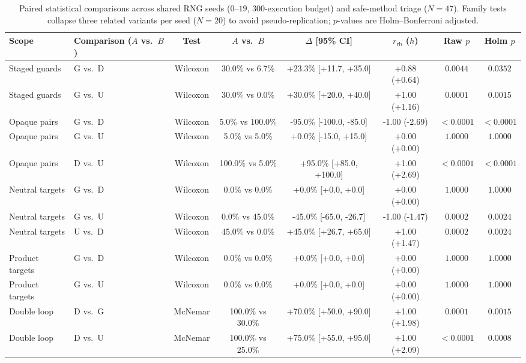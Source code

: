 \begin{table}[t]
\centering
\caption{Paired statistical comparisons across shared RNG seeds ($0$--$19$, 300-execution budget) and safe-method triage ($N = 47$). Family tests collapse three related variants per seed ($N=20$) to avoid pseudo-replication; $p$-values are Holm--Bonferroni adjusted.}
\label{tab:rq2-rq3-stats}
\small
\begin{tabular}{llcccccc}
\toprule
Scope & Comparison ($A$ vs.\ $B$) & Test & $A$ vs.\ $B$ & $\Delta$ [95\% CI] & $r_{\text{rb}}$ ($h$) & Raw $p$ & Holm $p$ \\
\midrule
Staged guards & G vs.\ D & Wilcoxon & 30.0\% vs 6.7\% & +23.3\% [+11.7, +35.0] & +0.88 (+0.64) & $0.0044$ & $0.0352$ \\
Staged guards & G vs.\ U & Wilcoxon & 30.0\% vs 0.0\% & +30.0\% [+20.0, +40.0] & +1.00 (+1.16) & $0.0001$ & $0.0015$ \\
Opaque pairs & G vs.\ D & Wilcoxon & 5.0\% vs 100.0\% & -95.0\% [-100.0, -85.0] & -1.00 (-2.69) & $<0.0001$ & $<0.0001$ \\
Opaque pairs & G vs.\ U & Wilcoxon & 5.0\% vs 5.0\% & +0.0\% [-15.0, +15.0] & +0.00 (+0.00) & $1.0000$ & $1.0000$ \\
Opaque pairs & D vs.\ U & Wilcoxon & 100.0\% vs 5.0\% & +95.0\% [+85.0, +100.0] & +1.00 (+2.69) & $<0.0001$ & $<0.0001$ \\
Neutral targets & G vs.\ D & Wilcoxon & 0.0\% vs 0.0\% & +0.0\% [+0.0, +0.0] & +0.00 (+0.00) & $1.0000$ & $1.0000$ \\
Neutral targets & G vs.\ U & Wilcoxon & 0.0\% vs 45.0\% & -45.0\% [-65.0, -26.7] & -1.00 (-1.47) & $0.0002$ & $0.0024$ \\
Neutral targets & U vs.\ D & Wilcoxon & 45.0\% vs 0.0\% & +45.0\% [+26.7, +65.0] & +1.00 (+1.47) & $0.0002$ & $0.0024$ \\
Product targets & G vs.\ D & Wilcoxon & 0.0\% vs 0.0\% & +0.0\% [+0.0, +0.0] & +0.00 (+0.00) & $1.0000$ & $1.0000$ \\
Product targets & G vs.\ U & Wilcoxon & 0.0\% vs 0.0\% & +0.0\% [+0.0, +0.0] & +0.00 (+0.00) & $1.0000$ & $1.0000$ \\
Double loop & D vs.\ G & McNemar & 100.0\% vs 30.0\% & +70.0\% [+50.0, +90.0] & +1.00 (+1.98) & $0.0001$ & $0.0015$ \\
Double loop & D vs.\ U & McNemar & 100.0\% vs 25.0\% & +75.0\% [+55.0, +95.0] & +1.00 (+2.09) & $<0.0001$ & $0.0008$ \\

\end{tabular}
\end{table}
